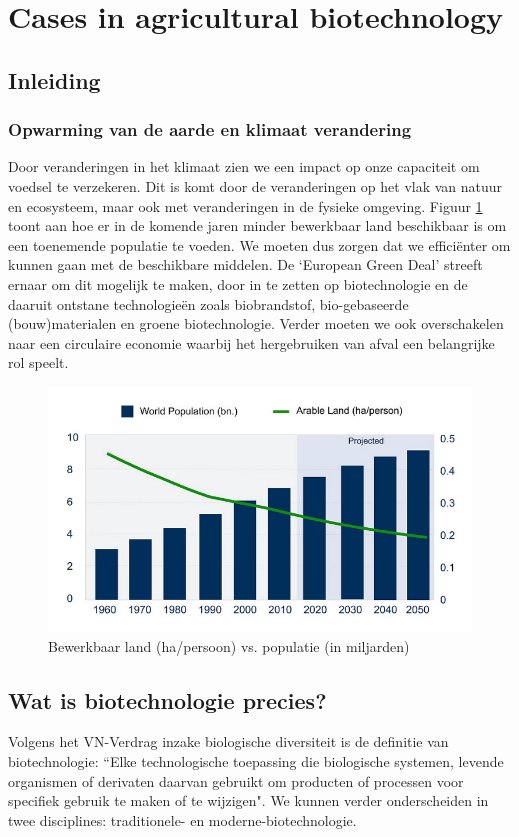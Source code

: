 \documentclass[a4paper,kul]{kulakarticle} %
\begin{document}
\section{Cases in agricultural biotechnology}
\subsection{Inleiding}
\subsubsection{Opwarming van de aarde en klimaat verandering}
Door veranderingen in het klimaat zien we een impact op onze capaciteit om voedsel te verzekeren. Dit is komt door de veranderingen op het vlak van natuur en ecosysteem, maar ook met veranderingen in de fysieke omgeving. Figuur \ref{fig:voedselvoorziening} toont aan hoe er in de komende jaren minder bewerkbaar land beschikbaar is om een toenemende populatie te voeden. We moeten dus zorgen dat we efficiënter om kunnen gaan met de beschikbare middelen. De `European Green Deal' streeft ernaar om dit mogelijk te maken, door in te zetten op biotechnologie en de daaruit ontstane technologieën zoals biobrandstof, bio-gebaseerde (bouw)materialen en groene biotechnologie. Verder moeten we ook overschakelen naar een circulaire economie waarbij het hergebruiken van afval een belangrijke rol speelt.
\begin{figure}[h]
	\centering
	\includegraphics[width=0.7\linewidth]{VoedselVoorziening}
	\caption[Voedsel voorziening]{Bewerkbaar land (ha/persoon) vs. populatie (in miljarden)}
	\label{fig:voedselvoorziening}
\end{figure}
\subsection{Wat is biotechnologie precies?}
Volgens het VN-Verdrag inzake biologische diversiteit is de definitie van biotechnologie: “Elke technologische toepassing die biologische systemen, levende organismen of derivaten daarvan gebruikt om producten of processen voor specifiek gebruik te maken of te wijzigen". We kunnen verder onderscheiden in twee disciplines: traditionele- en moderne-biotechnologie.  
\end{document}
